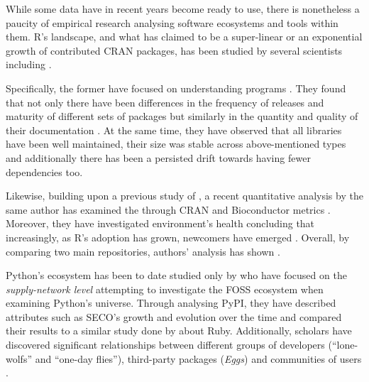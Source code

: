 While some data have in recent years become ready to use, there is nonetheless a paucity of empirical research analysing software ecosystems and tools within them.
R's landscape, and what \textcite{MattAsay2016ExponentialCompetitors} has claimed to be a super-linear or an exponential growth of contributed \ac{CRAN} packages, has been studied by several scientists including \textcites{German2013TheEcosystem}{Plakidas2017EvolutionQualities}.

Specifically, the former have focused on understanding  programs \parencite[90]{K.Plakidas2016HowEcosystem.}.
They found that not only there have been differences in the frequency of releases and maturity of different sets of packages but similarly in the quantity and quality of their documentation \parencite{German2013TheEcosystem}.
At the same time, they have observed that all libraries have been well maintained, their size was stable across above-mentioned types and additionally there has been a persisted drift towards having fewer dependencies too.

Likewise, building upon a previous study of \textcite{K.Plakidas2016HowEcosystem.}, a recent quantitative analysis by the same author has examined the  through \ac{CRAN} and Bioconductor metrics \parencite[3]{Plakidas2017EvolutionQualities}.
Moreover, they have investigated environment's health concluding that increasingly, as R's adoption has grown, newcomers have emerged  \parencite[62]{Plakidas2017EvolutionQualities}.
Overall, by comparing two main repositories, authors' analysis has shown  \parencite[62]{Plakidas2017EvolutionQualities}.

Python's ecosystem has been to date studied only by \textcite[13]{Hoving2013Python:Ecosystem} who have focused on the \emph{supply-network level} attempting to investigate  the \ac{FOSS} ecosystem when examining Python's universe. 
Through analysing \ac{PyPI}, they have described attributes such as \ac{SECO}'s growth and evolution over the time and compared their results to a similar study done by \textcite{RubyJaapJansen2011} about Ruby.
Additionally, scholars have discovered significant relationships between different groups of developers (\enquote{lone-wolfs} and \enquote{one-day flies}), third-party packages (\emph{Eggs}) and communities of users \parencite{Hoving2013Python:Ecosystem}.

